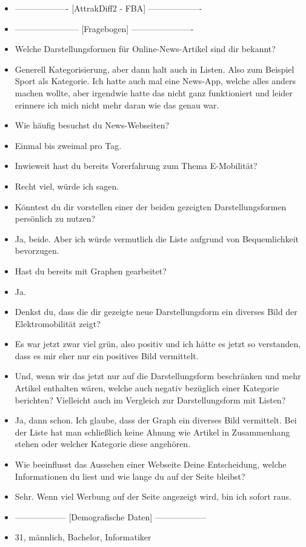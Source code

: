 {\begin{itemize}[]
        \item {-------------------} [AttrakDiff2 - FBA] {-------------------}
        \item {-----------------------} [Fragebogen] {----------------------}
        \item {} Welche Darstellungsformen für Online-News-Artikel sind dir bekannt?
        \item {} Generell Kategorisierung, aber dann halt auch in Listen. Also zum Beispiel Sport als Kategorie.
              Ich hatte auch mal eine News-App, welche alles anders machen wollte, aber irgendwie hatte das nicht ganz funktioniert und leider erinnere ich mich nicht mehr daran wie das genau war.
        \item {} Wie häufig besuchst du News-Webseiten?
        \item {} Einmal bis zweimal pro Tag.
        \item {} Inwieweit hast du bereits Vorerfahrung zum Thema E-Mobilität?
        \item {} Recht viel, würde ich sagen.
        \item {} Könntest du dir vorstellen einer der beiden gezeigten Darstellungsformen persönlich zu nutzen?
        \item {} Ja, beide. Aber ich würde vermutlich die Liste aufgrund von Bequemlichkeit bevorzugen.
        \item {} Hast du bereits mit Graphen gearbeitet?
        \item {} Ja.
        \item {} Denkst du, dass die dir gezeigte neue Darstellungsform ein diverses Bild der Elektromobilität zeigt?
        \item {} Es war jetzt zwar viel grün, also positiv und ich hätte es jetzt so verstanden, dass es mir eher nur ein positives Bild vermittelt.
        \item {} Und, wenn wir das jetzt nur auf die Darstellungsform beschränken und mehr Artikel enthalten wären, welche auch negativ bezüglich einer Kategorie berichten?
              Vielleicht auch im Vergleich zur Darstellungsform mit Listen?
        \item {} Ja, dann schon. Ich glaube, dass der Graph ein diverses Bild vermittelt.
              Bei der Liste hat man schließlich keine Ahnung wie Artikel in Zusammenhang stehen oder welcher Kategorie diese angehören.
        \item {} Wie beeinflusst das Aussehen einer Webseite Deine Entscheidung, welche Informationen du liest und wie lange du auf der Seite bleibst?
        \item {} Sehr. Wenn viel Werbung auf der Seite angezeigt wird, bin ich sofort raus.
        \item {------------------} [Demografische Daten] {------------------}
        \item {} 31, männlich, Bachelor, Informatiker 
    \end{itemize}} 
\nolinenumbers
